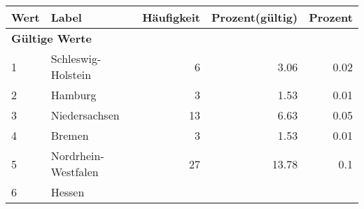      \begin{longtable}{lXrrr}
     \toprule
     \textbf{Wert} & \textbf{Label} & \textbf{Häufigkeit} & \textbf{Prozent(gültig)} & \textbf{Prozent} \\
     \endhead
     \midrule
     \multicolumn{5}{l}{\textbf{Gültige Werte}}\\

     1 &
     \multicolumn{1}{X}{ Schleswig-Holstein   } &


       \num{6} &
       \num[round-mode=places,round-precision=2]{3,06} &
         \num[round-mode=places,round-precision=2]{0,02} \\

     2 &
     \multicolumn{1}{X}{ Hamburg   } &


       \num{3} &
       \num[round-mode=places,round-precision=2]{1,53} &
         \num[round-mode=places,round-precision=2]{0,01} \\

     3 &
     \multicolumn{1}{X}{ Niedersachsen   } &


       \num{13} &
       \num[round-mode=places,round-precision=2]{6,63} &
         \num[round-mode=places,round-precision=2]{0,05} \\

     4 &
     \multicolumn{1}{X}{ Bremen   } &


       \num{3} &
       \num[round-mode=places,round-precision=2]{1,53} &
         \num[round-mode=places,round-precision=2]{0,01} \\

     5 &
     \multicolumn{1}{X}{ Nordrhein-Westfalen   } &


       \num{27} &
       \num[round-mode=places,round-precision=2]{13,78} &
         \num[round-mode=places,round-precision=2]{0,1} \\

     6 &
     \multicolumn{1}{X}{ Hessen   } &



\end{longtable}
